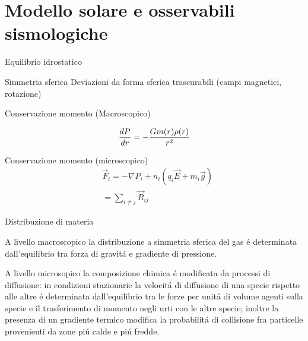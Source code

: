 \documentclass[10pt,xcolor={usenames},fleqn,mathserif,serif]{beamer}
\begin{document}
\part{Modello solare e osservabili sismologiche}\label{part:MSS}
\frame{\partpage}




\begin{frame}{Equilibrio idrostatico}


\begin{block}{Simmetria sferica}
Deviazioni da forma sferica trascurabili (campi magnetici, rotazione)
\end{block}


\begin{block}{Conservazione momento (Macroscopico)}

\begin{equation*}
\TDy{r}{P}=-\frac{Gm(r)\rho(r)}{r^2}%
\end{equation*}

\end{block}

\begin{block}{Conservazione momento (microscopico)}
\begin{align*}
&\vec{F}_i=-\nabla P_i+n_i(q_i\vec{E}+m_i\vec{g})\\
&=\sum_{i\neq j}\vec{R}_{ij}
\end{align*}

\end{block}

\end{frame}

\begin{wordonframe}{Distribuzione di materia}

A livello macroscopico la distribuzione a simmetria sferica del gas \'e determinata dall'equilibrio tra forza di gravit\'a e gradiente di pressione.

A livello microsopico la composizione chimica \'e modificata da processi di diffusione: in condizioni stazionarie la velocit\'a di diffusione di una specie rispetto alle altre \'e determinata dall'equilibrio tra le forze per unit\'a di volume agenti sulla specie e il trasferimento di momento negli urti con le altre specie; inoltre la presenza di un gradiente termico modifica la probabilit\'a di collisione fra particelle provenienti da zone pi\'u calde e pi\'u fredde.

\end{wordonframe}
\end{document}

